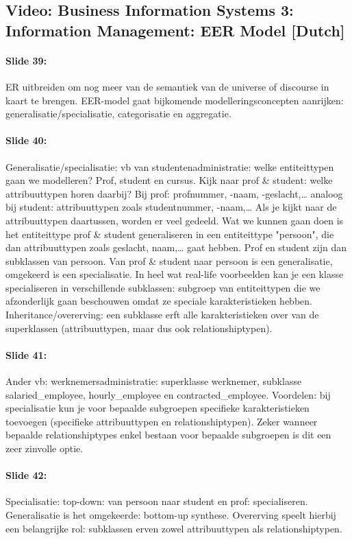 \documentclass[10pt,a4paper]{report}
\begin{document}
\subsection{Video: Business Information Systems 3: Information Management: EER Model [Dutch]}

\paragraph{Slide 39:}ER uitbreiden om nog meer van de semantiek van de universe of discourse in kaart te brengen. EER-model gaat bijkomende modelleringsconcepten aanrijken: generalisatie/specialisatie, categorisatie en aggregatie.

\paragraph{Slide 40:}Generalisatie/specialisatie: vb van studentenadministratie: welke entiteittypen gaan we modelleren? Prof, student en cursus. Kijk naar prof \& student: welke attribuuttypen horen daarbij? Bij prof: profnummer, -naam, -geslacht,… analoog bij student: attribuuttypen zoals studentnummer, -naam,… Als je kijkt naar de attribuuttypen daartussen, worden er veel gedeeld. Wat we kunnen gaan doen is het entiteittype prof \& student generaliseren in een entiteittype "persoon", die dan attribuuttypen zoals geslacht, naam,… gaat hebben. Prof en student zijn dan subklassen van persoon. Van prof \& student naar persoon is een generalisatie, omgekeerd is een specialisatie. In heel wat real-life voorbeelden kan je een klasse specialiseren in verschillende subklassen: subgroep van entiteittypen die we afzonderlijk gaan beschouwen omdat ze speciale karakteristieken hebben. Inheritance/overerving: een subklasse erft alle karakteristieken over van de superklassen (attribuuttypen, maar dus ook relationshiptypen).

\paragraph{Slide 41:}Ander vb: werknemersadministratie: superklasse werknemer, subklasse salaried\_employee, hourly\_employee en contracted\_employee. Voordelen: bij specialisatie kun je voor bepaalde subgroepen specifieke karakteristieken toevoegen (specifieke attribuuttypen en relationshiptypen). Zeker wanneer bepaalde relationshiptypes enkel bestaan voor bepaalde subgroepen is dit een zeer zinvolle optie.

\paragraph{Slide 42:}Specialisatie: top-down: van persoon naar student en prof: specialiseren. Generalisatie is het omgekeerde: bottom-up synthese. Overerving speelt hierbij een belangrijke rol: subklassen erven zowel attribuuttypen als relationshiptypen.
\end{document}
